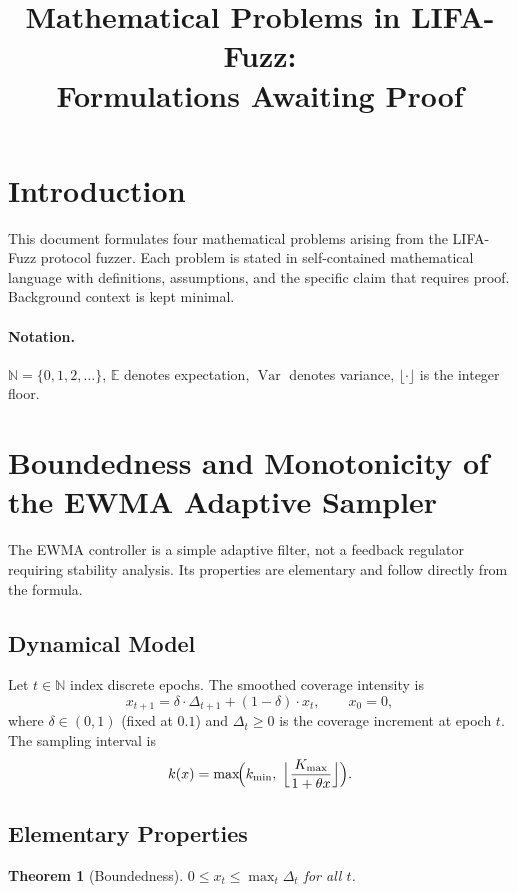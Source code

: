 \documentclass[11pt,a4paper]{article}
\title{Mathematical Problems in LIFA-Fuzz:\\Formulations Awaiting Proof}
\author{}
\date{}
\newtheorem{theorem}{Theorem}
\begin{document}
\maketitle

\section{Introduction}

This document formulates four mathematical problems arising from the
LIFA-Fuzz protocol fuzzer. Each problem is stated in self-contained
mathematical language with definitions, assumptions, and the specific
claim that requires proof. Background context is kept minimal.

\paragraph{Notation.}
$\mathbb{N} = \{0,1,2,\dots\}$, $\mathbb{E}$ denotes expectation,
$\operatorname{Var}$ denotes variance, $\lfloor\cdot\rfloor$ is the
integer floor.

\section{Boundedness and Monotonicity of the EWMA Adaptive Sampler}

The EWMA controller is a simple adaptive filter, not a feedback regulator
requiring stability analysis. Its properties are elementary
and follow directly from the formula.

\subsection{Dynamical Model}

Let $t \in \mathbb{N}$ index discrete epochs. The smoothed coverage
intensity is
\[
x_{t+1} = \delta \cdot \Delta_{t+1} + (1-\delta) \cdot x_t,
\qquad x_0 = 0,
\]
where $\delta \in (0,1)$ (fixed at $0.1$) and $\Delta_t \ge 0$ is the
coverage increment at epoch $t$. The sampling interval is
\[
k(x) = \max\!\Bigl(k_{\min},\;\Bigl\lfloor \frac{K_{\max}}{1+\theta x}\Bigr\rfloor\Bigr).
\]

\subsection{Elementary Properties}

\begin{theorem}[Boundedness]
$0 \le x_t \le \max_t \Delta_t$ for all $t$.
\end{theorem}
\end{document}
